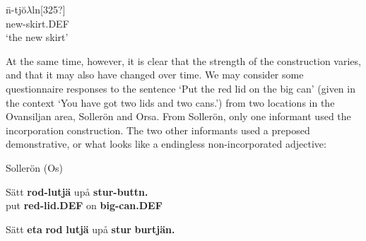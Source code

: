 
 \ea\label{}
\gll n\=\ir-tj\u{o}$\lambda $ln[325?]\\


new-skirt.DEF\\

\glt ‘the new skirt’

\z

At the same time, however, it is clear that the strength of the construction varies, and that it may also have changed over time. We may consider some questionnaire responses to the sentence ‘Put the red lid on the big can’ (given in the context ‘You have got two lids and two cans.’) from two locations in the Ovansiljan area, Sollerön and Orsa. From Sollerön, only one informant used the incorporation construction. The two other informants used a preposed demonstrative, or what looks like a endingless non-incorporated adjective: 


\item 

Sollerön (Os)



\item 


 \ea\label{}
\gll Sätt  \textbf{rod-lutjä} upå  \textbf{stur-buttn.}\\


put  \textbf{red-lid.DEF} on  \textbf{big-can.DEF}\\

\item 


 \ea\label{}
\gll Sätt  \textbf{eta}\textbf{  rod}\textbf{  lutjä} upå  \textbf{stur}\textbf{  burtjän.}\\


